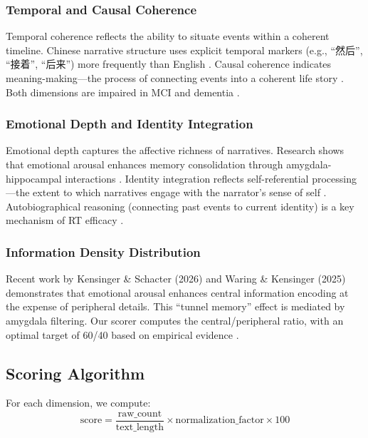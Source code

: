 \documentclass{article}
\begin{document}
\subsubsection{Temporal and Causal Coherence}

Temporal coherence reflects the ability to situate events within a coherent timeline. Chinese narrative structure uses explicit temporal markers (e.g., ``然后'', ``接着'', ``后来'') more frequently than English \cite{chen2021, li2025}. Causal coherence indicates meaning-making---the process of connecting events into a coherent life story \cite{habermas2024, mcadams2025}. Both dimensions are impaired in MCI and dementia \cite{murphy2023, dijkstra2025}.

\subsubsection{Emotional Depth and Identity Integration}

Emotional depth captures the affective richness of narratives. Research shows that emotional arousal enhances memory consolidation through amygdala-hippocampal interactions \cite{kensinger2024, mcgaugh2025}. Identity integration reflects self-referential processing---the extent to which narratives engage with the narrator's sense of self \cite{conway2024, adler2025}. Autobiographical reasoning (connecting past events to current identity) is a key mechanism of RT efficacy \cite{westerhof2024}.

\subsubsection{Information Density Distribution}

Recent work by Kensinger \& Schacter (2026) \cite{kensinger2026} and Waring \& Kensinger (2025) \cite{waring2025} demonstrates that emotional arousal enhances central information encoding at the expense of peripheral details. This ``tunnel memory'' effect is mediated by amygdala filtering. Our scorer computes the central/peripheral ratio, with an optimal target of 60/40 based on empirical evidence \cite{kensinger2026}.

\subsection{Scoring Algorithm}

For each dimension, we compute:
\begin{equation}
\text{score} = \frac{\text{raw\_count}}{\text{text\_length}} \times \text{normalization\_factor} \times 100
\end{equation}
\end{document}
